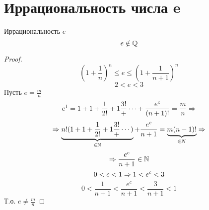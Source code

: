 ﻿\section{Иррациональность числа e}

\begin{theorem}{Иррациональность $e$}
$$e \notin \mathbb{Q}$$
\end{theorem}
\begin{proof}
$$\left(1+\frac1n\right)^n \leqslant e \leqslant \left(1+\frac1{n+1}\right)^n$$
$$2 < e < 3$$
Пусть $e = \frac{m}{n}$
$$e^1 = 1 + 1 + \frac1{2!} + 1\frac{3!} + \cdots + \frac{e^c}{(n+1)!} = \frac{m}{n} \Rightarrow$$
$$\Rightarrow \underbrace{n!(1 + 1 + \frac1{2!} + 1\frac{3!} + \cdots)}_{\in \mathbb{N}} + \frac{e^c}{n+1} = \underbrace{m(n-1)!}_{\in N} \Rightarrow$$
$$\Rightarrow \frac{e^c}{n+1} \in \mathbb{N}$$
$$0<c<1 \Rightarrow 1 < e^c < 3$$
$$0 < \frac{1}{n+1} < \frac{e^c}{n+1} < \frac{3}{n + 1} < 1$$
Т.о. $e \ne \frac{m}{n}$
\end{proof}
